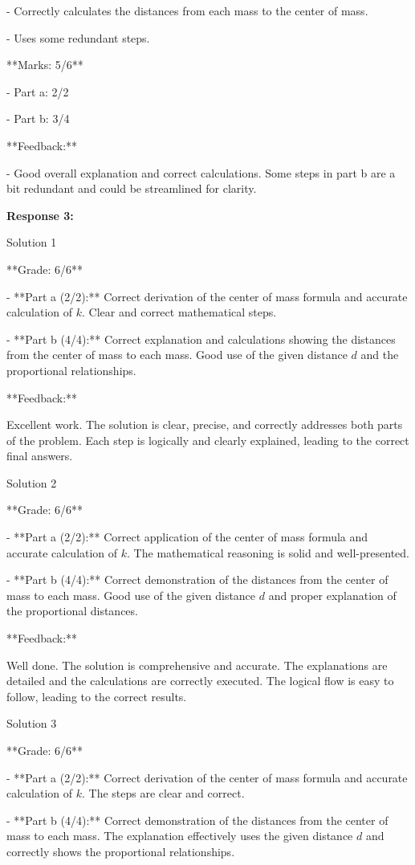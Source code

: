 \documentclass[a4paper,11pt]{article}
\begin{document}
- Correctly calculates the distances from each mass to the center of mass.

- Uses some redundant steps.

**Marks: 5/6**

- Part a: 2/2

- Part b: 3/4

**Feedback:**

- Good overall explanation and correct calculations. Some steps in part b are a bit redundant and could be streamlined for clarity.

\bigskip
\textbf{Response 3:}

Solution 1

**Grade: 6/6**

- **Part a (2/2):** Correct derivation of the center of mass formula and accurate calculation of \( k \). Clear and correct mathematical steps.

- **Part b (4/4):** Correct explanation and calculations showing the distances from the center of mass to each mass. Good use of the given distance \( d \) and the proportional relationships.

**Feedback:**

Excellent work. The solution is clear, precise, and correctly addresses both parts of the problem. Each step is logically and clearly explained, leading to the correct final answers.

Solution 2

**Grade: 6/6**

- **Part a (2/2):** Correct application of the center of mass formula and accurate calculation of \( k \). The mathematical reasoning is solid and well-presented.

- **Part b (4/4):** Correct demonstration of the distances from the center of mass to each mass. Good use of the given distance \( d \) and proper explanation of the proportional distances.

**Feedback:**

Well done. The solution is comprehensive and accurate. The explanations are detailed and the calculations are correctly executed. The logical flow is easy to follow, leading to the correct results.

Solution 3

**Grade: 6/6**

- **Part a (2/2):** Correct derivation of the center of mass formula and accurate calculation of \( k \). The steps are clear and correct.

- **Part b (4/4):** Correct demonstration of the distances from the center of mass to each mass. The explanation effectively uses the given distance \( d \) and correctly shows the proportional relationships.
\end{document}
